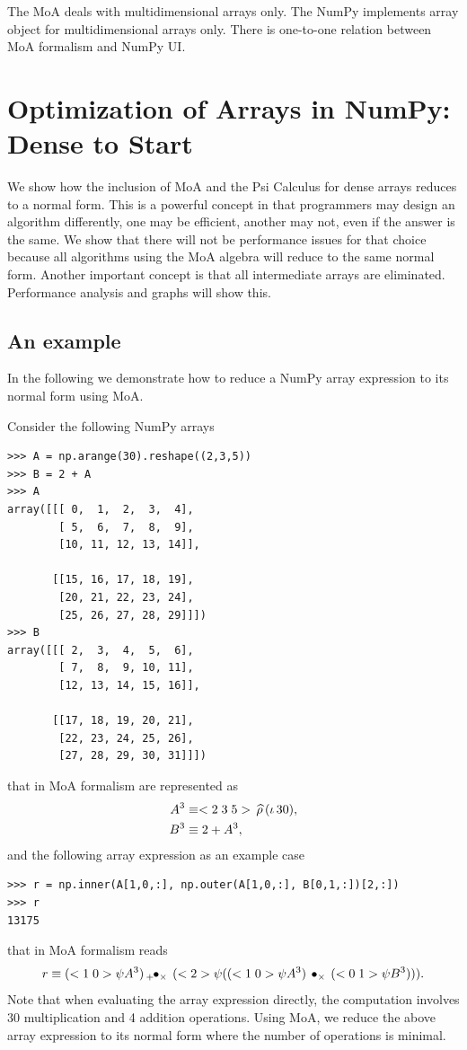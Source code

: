 \documentclass[a4paper,12pt]{article}
\begin{document}
The MoA deals with multidimensional arrays only.  The NumPy implements
array object for multidimensional arrays only. There is one-to-one
relation between MoA formalism and NumPy UI.

\section{Optimization of Arrays in NumPy: Dense to Start}
We show how the inclusion of MoA and the Psi Calculus for dense arrays
reduces to a normal form. This is a powerful concept in that programmers may design an algorithm differently, one may be efficient, another may not, even if the answer is the same. 
\noindent
We show that there will not be performance issues for that choice because all algorithms using the MoA algebra will reduce to the same normal form. Another important concept is that all intermediate arrays are eliminated. Performance analysis and graphs will show this.

\subsection{An example}

In the following we demonstrate how to reduce a NumPy array expression
to its normal form using MoA.

Consider the following NumPy arrays
\begin{verbatim}
>>> A = np.arange(30).reshape((2,3,5))
>>> B = 2 + A
>>> A
array([[[ 0,  1,  2,  3,  4],
        [ 5,  6,  7,  8,  9],
        [10, 11, 12, 13, 14]],

       [[15, 16, 17, 18, 19],
        [20, 21, 22, 23, 24],
        [25, 26, 27, 28, 29]]])
>>> B
array([[[ 2,  3,  4,  5,  6],
        [ 7,  8,  9, 10, 11],
        [12, 13, 14, 15, 16]],

       [[17, 18, 19, 20, 21],
        [22, 23, 24, 25, 26],
        [27, 28, 29, 30, 31]]])
\end{verbatim}
that in MoA formalism are represented as
\begin{align}
  A^3 &\equiv <2\;3\;5>\,\widehat{\rho}\,(\iota\,30), \\
  B^3 &\equiv 2+A^3,
\end{align}
and the following array expression as an example case
\begin{verbatim}
>>> r = np.inner(A[1,0,:], np.outer(A[1,0,:], B[0,1,:])[2,:])
>>> r
13175
\end{verbatim}
that in MoA formalism reads
\begin{equation}
r \equiv (<1\;0>\psi A^3) \,{}_{+}\!\!\bullet_{\times}\, (<2>\psi((<1\;0>\psi A^3) \,\bullet_{\times}\, (<0\;1>\psi B^3))).
\end{equation}
Note that when evaluating the array expression directly, the
computation involves 30 multiplication and 4 addition
operations. Using MoA, we reduce the above array expression to its
normal form where the number of operations is minimal.
\end{document}
